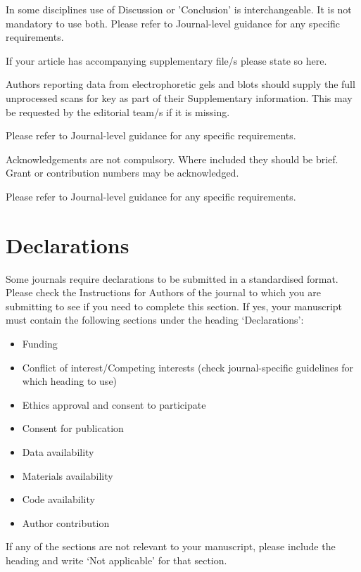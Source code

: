 \documentclass[pdflatex,sn-apa]{sn-jnl}%
\begin{document}
In some disciplines use of Discussion or 'Conclusion' is interchangeable. It is not mandatory to use both. Please refer to Journal-level guidance for any specific requirements. 

\backmatter


If your article has accompanying supplementary file/s please state so here. 

Authors reporting data from electrophoretic gels and blots should supply the full unprocessed scans for key as part of their Supplementary information. This may be requested by the editorial team/s if it is missing.

Please refer to Journal-level guidance for any specific requirements.


Acknowledgements are not compulsory. Where included they should be brief. Grant or contribution numbers may be acknowledged.

Please refer to Journal-level guidance for any specific requirements.

\section*{Declarations}

Some journals require declarations to be submitted in a standardised format. Please check the Instructions for Authors of the journal to which you are submitting to see if you need to complete this section. If yes, your manuscript must contain the following sections under the heading `Declarations':

\begin{itemize}
\item Funding
\item Conflict of interest/Competing interests (check journal-specific guidelines for which heading to use)
\item Ethics approval and consent to participate
\item Consent for publication
\item Data availability 
\item Materials availability
\item Code availability 
\item Author contribution
\end{itemize}

\noindent
If any of the sections are not relevant to your manuscript, please include the heading and write `Not applicable' for that section. 
\end{document}
